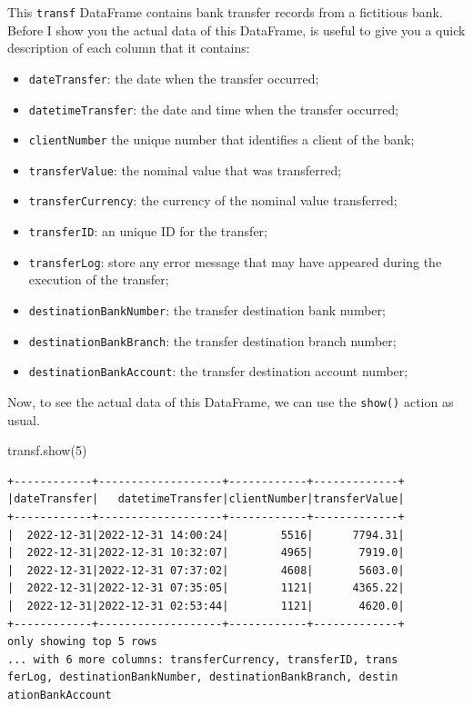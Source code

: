\documentclass[
  11pt,
  letterpaper,
  DIV=11,
  numbers=noendperiod]{scrreprt}
\newenvironment{Shaded}{\begin{snugshade}}{\end{snugshade}}
\newcommand{\DecValTok}[1]{\textcolor[rgb]{0.68,0.00,0.00}{#1}}
\newcommand{\NormalTok}[1]{\textcolor[rgb]{0.00,0.23,0.31}{#1}}
\providecommand{\tightlist}{%
  \setlength{\itemsep}{0pt}\setlength{\parskip}{0pt}}\usepackage{longtable,booktabs,array}
\begin{document}
This \texttt{transf} DataFrame contains bank transfer records from a
fictitious bank. Before I show you the actual data of this DataFrame, is
useful to give you a quick description of each column that it contains:

\begin{itemize}
\tightlist
\item
  \texttt{dateTransfer}: the date when the transfer occurred;
\item
  \texttt{datetimeTransfer}: the date and time when the transfer
  occurred;
\item
  \texttt{clientNumber} the unique number that identifies a client of
  the bank;
\item
  \texttt{transferValue}: the nominal value that was transferred;
\item
  \texttt{transferCurrency}: the currency of the nominal value
  transferred;
\item
  \texttt{transferID}: an unique ID for the transfer;
\item
  \texttt{transferLog}: store any error message that may have appeared
  during the execution of the transfer;
\item
  \texttt{destinationBankNumber}: the transfer destination bank number;
\item
  \texttt{destinationBankBranch}: the transfer destination branch
  number;
\item
  \texttt{destinationBankAccount}: the transfer destination account
  number;
\end{itemize}

Now, to see the actual data of this DataFrame, we can use the
\texttt{show()} action as usual.

\begin{Shaded}
\begin{Highlighting}[]
\NormalTok{transf.show(}\DecValTok{5}\NormalTok{)}
\end{Highlighting}
\end{Shaded}

\begin{verbatim}
+------------+-------------------+------------+-------------+
|dateTransfer|   datetimeTransfer|clientNumber|transferValue|
+------------+-------------------+------------+-------------+
|  2022-12-31|2022-12-31 14:00:24|        5516|      7794.31|
|  2022-12-31|2022-12-31 10:32:07|        4965|       7919.0|
|  2022-12-31|2022-12-31 07:37:02|        4608|       5603.0|
|  2022-12-31|2022-12-31 07:35:05|        1121|      4365.22|
|  2022-12-31|2022-12-31 02:53:44|        1121|       4620.0|
+------------+-------------------+------------+-------------+
only showing top 5 rows
... with 6 more columns: transferCurrency, transferID, trans
ferLog, destinationBankNumber, destinationBankBranch, destin
ationBankAccount
\end{verbatim}
\end{document}
